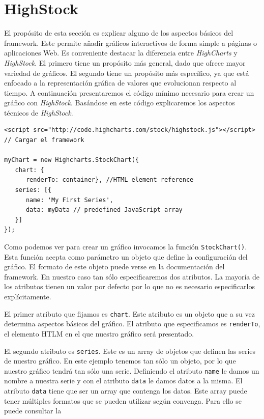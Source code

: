 \section{HighStock}
	El propósito de esta sección es explicar alguno de los aspectos básicos del framework. Este permite añadir gráficos interactivos de forma
	simple a páginas o aplicaciones Web. Es conveniente destacar la diferencia entre \emph{HighCharts} y \emph{HighStock}. El primero tiene un propósito más
	general, dado que ofrece mayor variedad de gráficos. El segundo tiene un propósito más específico, ya que está enfocado a la representación
	gráfica de valores que evolucionan respecto al tiempo. A continuación presentaremos el código mínimo necesario para crear un gráfico con
	\emph{HighStock}. Basándose en este código explicaremos los aspectos técnicos de \emph{HighStock}.
	\begin{lstlisting}[style=myJs]
<script src="http://code.highcharts.com/stock/highstock.js"></script>  // Cargar el framework

myChart = new Highcharts.StockChart({
   chart: {
      renderTo: container}, //HTML element reference
   series: [{
      name: 'My First Series',
      data: myData // predefined JavaScript array
   }]
});
	\end{lstlisting}
	\par
	Como podemos ver para crear un gráfico invocamos la función \texttt{StockChart()}. Esta función acepta como parámetro un objeto que
	define la configuración del gráfico. El formato de este objeto puede verse en la documentación del framework\cite{HighStockDoc}. En nuestro
	caso tan sólo especificaremos dos atributos. La mayoría de los atributos tienen un valor por defecto por lo que no es necesario especificarlos
	explícitamente. 
	\par
	El primer atributo que fijamos es \texttt{chart}. Este atributo es un objeto que a su vez determina aspectos básicos del gráfico. El
	atributo que especificamos es \texttt{renderTo}, el elemento HTLM en el que nuestro gráfico será presentado.
	\par
	El segundo atributo es \texttt{series}. Este es un array de objetos que definen las series de nuestro gráfico. En este
	ejemplo tenemos tan sólo un objeto, por lo que nuestro gráfico tendrá tan sólo una serie. Definiendo el atributo \texttt{name} le damos un
	nombre a nuestra serie y con el atributo \texttt{data} le damos datos a la misma. El atributo \texttt{data} tiene que ser un
	array que contenga los datos. Este array puede tener múltiples formatos que se pueden utilizar según convenga. Para ello se puede consultar la
